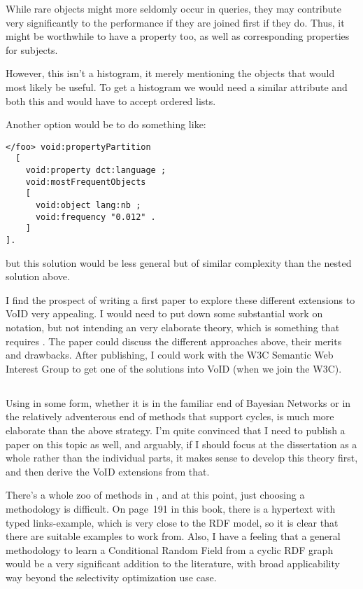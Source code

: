 While rare objects might more seldomly occur in queries, they may
contribute very significantly to the performance if they are joined
first if they do. Thus, it might be worthwhile to have a property
 too, as well as corresponding
properties for subjects.


However, this isn't a histogram, it merely mentioning the objects that
would most likely be useful. To get a histogram we would need a
similar  attribute and both this and
 would have to accept ordered
lists. 

Another option would be to do something like:
\begin{verbatim}
</foo> void:propertyPartition 
  [
    void:property dct:language ;
    void:mostFrequentObjects 
    [
      void:object lang:nb ;
      void:frequency "0.012" .
    ]
].
\end{verbatim}
but this solution would be less general but of similar complexity than
the nested solution above.

I find the prospect of writing a first paper to explore these different
extensions to VoID very appealing. I would need to put down some
substantial work on notation, but not intending an very elaborate
theory, which is something that requires \SRL. The paper could discuss
the different approaches above, their merits and drawbacks. After
publishing, I could work with the W3C Semantic Web Interest Group to
get one of the solutions into VoID (when we join the W3C).


\subsection{\SRL}

Using \SRL{} in some form, whether it is in the familiar end of
Bayesian Networks or in the relatively adventerous end of methods that
support cycles, is much more elaborate than the above strategy. I'm
quite convinced that I need to publish a paper on this topic as well,
and arguably, if I should focus at the dissertation as a whole rather
than the individual parts, it makes sense to develop this theory
first, and then derive the VoID extensions from that.

There's a whole zoo of methods in \cite{srlbook}, and at this point,
just choosing a methodology is difficult. On page~191 in this book,
there is a hypertext with typed links-example, which is very close to
the RDF model, so it is clear that there are suitable examples to work
from. Also, I have a feeling that a general methodology to learn a
Conditional Random Field from a cyclic RDF graph would be a very
significant addition to the literature, with broad applicability way
beyond the selectivity optimization use case.


